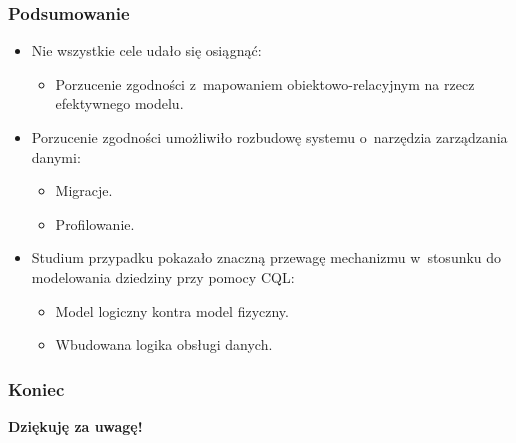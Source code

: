 \documentclass{beamer}
\begin{document}
	\begin{frame}
		\frametitle{Podsumowanie}

		\begin{itemize}
			\item Nie wszystkie cele udało się osiągnąć:
				\begin{itemize}
					\item Porzucenie zgodności z~mapowaniem obiektowo-relacyjnym na rzecz efektywnego modelu.
				\end{itemize}
			\item Porzucenie zgodności umożliwiło rozbudowę systemu o~narzędzia zarządzania danymi:
				\begin{itemize}
					\item Migracje.
					\item Profilowanie.
				\end{itemize}
			\item Studium przypadku pokazało znaczną przewagę mechanizmu w~stosunku do modelowania dziedziny przy pomocy CQL:
				\begin{itemize}
					\item Model logiczny kontra model fizyczny.
					\item Wbudowana logika obsługi danych.
				\end{itemize}
		\end{itemize}
		
	\end{frame}

	\begin{frame}
		\frametitle{Koniec}

		\begin{center}
			\LARGE \textbf{Dziękuję za uwagę!}
		\end{center}
	\end{frame}
\end{document}
